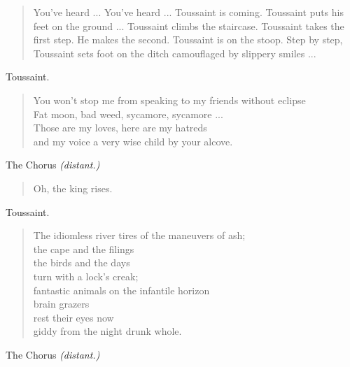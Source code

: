\documentclass[letterpaper,article,12pt,oneside,notitlepage]{memoir}
\begin{document}
\begin{verse}
\indent You've heard ... You've heard ... Toussaint is coming. Toussaint puts his feet on the ground ... Toussaint climbs the staircase. Toussaint takes the first step. He makes the second. Toussaint is on the stoop. Step by step, Toussaint sets foot on the ditch camouflaged by slippery smiles ... \\
\end{verse}

\begin{center}Toussaint.\end{center}

\begin{verse}
\hspace{1cm} You won't stop me from speaking to my friends without eclipse \\
Fat moon, bad weed, sycamore, sycamore ... \\
Those are my loves, here are my hatreds \\
and my voice a very wise child by your alcove. \\
\end{verse}

\begin{center}The Chorus \textit{(distant.)}\end{center}

\begin{verse}
\hspace{1cm} Oh, the king rises. \\
\end{verse}

\begin{center}Toussaint.\end{center}

\begin{verse}
\hspace{1cm} The idiomless river tires of the maneuvers of ash; \\
the cape and the filings \\
the birds and the days \\
turn with a lock's creak; \\
fantastic animals on the infantile horizon \\
brain grazers \\
rest their eyes now \\
giddy from the night drunk whole. \\
\end{verse}

\begin{center}The Chorus \textit{(distant.)}\end{center}
\end{document}
